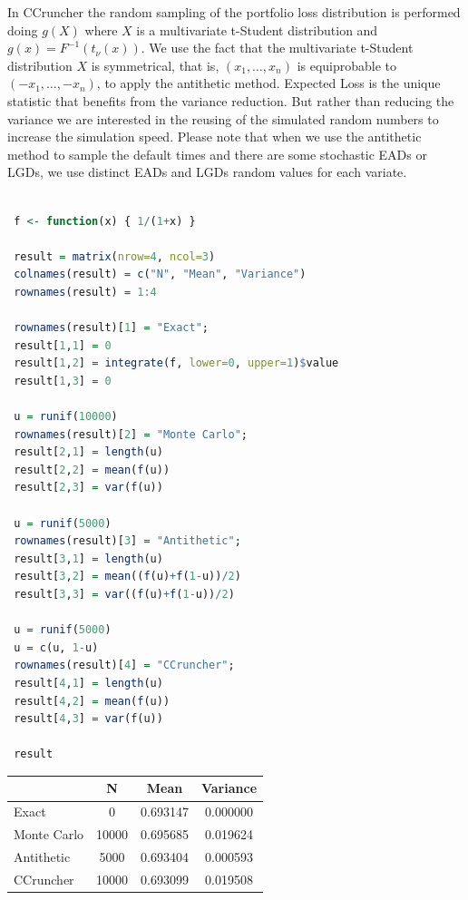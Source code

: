 \documentclass[11pt,fleqn]{book} %
\begin{document}
In CCruncher the random sampling of the portfolio loss distribution is 
performed doing $g(X)$ where $X$ is a multivariate t-Student distribution 
and $g(x) = F^{-1}(t_{\nu}(x))$. We use the fact that the multivariate 
t-Student distribution $X$ is symmetrical, that is, $(x_1,\dots,x_n)$ is 
equiprobable to $(-x_1,\dots,-x_n)$, to apply the antithetic method. 
Expected Loss is the unique statistic that benefits from the variance 
reduction. But rather than reducing the variance we are interested 
in the reusing of the simulated random numbers to increase the simulation 
speed. Please note that when we use the antithetic method to sample the 
default times and there are some stochastic EADs or LGDs, we use distinct 
EADs and LGDs random values for each variate.

\begin{lstlisting}[language=R, label=sc:antithetic, caption=Antithetic example (R script)]

 f <- function(x) { 1/(1+x) }
 
 result = matrix(nrow=4, ncol=3)
 colnames(result) = c("N", "Mean", "Variance")
 rownames(result) = 1:4

 rownames(result)[1] = "Exact";
 result[1,1] = 0
 result[1,2] = integrate(f, lower=0, upper=1)$value
 result[1,3] = 0

 u = runif(10000)
 rownames(result)[2] = "Monte Carlo";
 result[2,1] = length(u)
 result[2,2] = mean(f(u))
 result[2,3] = var(f(u))

 u = runif(5000)
 rownames(result)[3] = "Antithetic";
 result[3,1] = length(u)
 result[3,2] = mean((f(u)+f(1-u))/2)
 result[3,3] = var((f(u)+f(1-u))/2)

 u = runif(5000)
 u = c(u, 1-u)
 rownames(result)[4] = "CCruncher";
 result[4,1] = length(u)
 result[4,2] = mean(f(u))
 result[4,3] = var(f(u))
 
 result

\end{lstlisting}
\hspace*{1cm}
\begin{tabular}{l|c|c|c|}
	\cline{2-4}
	& N & Mean & Variance \\
	\hline
	\multicolumn{1}{|l|}{Exact} & 0 & 0.693147 & 0.000000 \\
	\hline
	\multicolumn{1}{|l|}{Monte Carlo} & 10000 & 0.695685 & 0.019624 \\
	\hline
	\multicolumn{1}{|l|}{Antithetic} & 5000 & 0.693404 & 0.000593 \\
	\hline
	\multicolumn{1}{|l|}{CCruncher} & 10000 & 0.693099 & 0.019508 \\
	\hline
\end{tabular}
\vspace{11pt}
\end{document}
